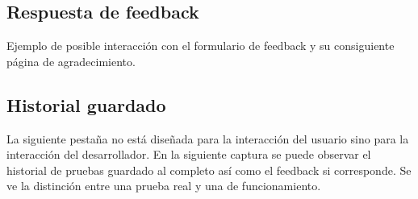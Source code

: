 \subsection{Respuesta de feedback}
Ejemplo de posible interacción con el formulario de feedback y su consiguiente página de agradecimiento.


\subsection{Historial guardado}
La siguiente pestaña no está diseñada para la interacción del usuario sino para la interacción del desarrollador. En la siguiente captura se puede observar el historial de pruebas guardado al completo así como el feedback si corresponde. Se ve la distinción entre una prueba real y una de funcionamiento.

